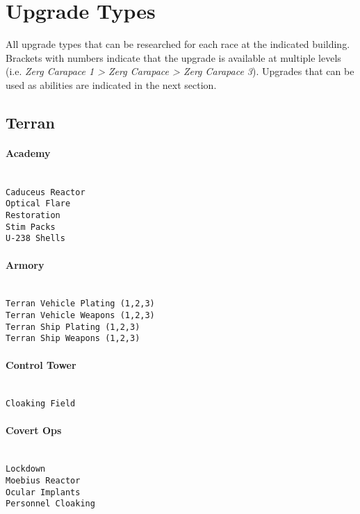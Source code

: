 \newpage
\section{Upgrade Types}
\label{upgradetype}
All upgrade types that can be researched for each race at the indicated building. Brackets with numbers indicate that the upgrade is available at multiple levels (i.e. \textit{Zerg Carapace 1 > Zerg Carapace > Zerg Carapace 3}). Upgrades that can be used as abilities are indicated in the next section.

\subsection{Terran}

\paragraph{Academy} \mbox{}\\
\verb|Caduceus Reactor|\\
\verb|Optical Flare|\\
\verb|Restoration|\\
\verb|Stim Packs|\\
\verb|U-238 Shells|

\paragraph{Armory} \mbox{}\\
\verb|Terran Vehicle Plating (1,2,3)|\\
\verb|Terran Vehicle Weapons (1,2,3)|\\
\verb|Terran Ship Plating (1,2,3)|\\
\verb|Terran Ship Weapons (1,2,3)|

\paragraph{Control Tower} \mbox{}\\
\verb|Cloaking Field|

\paragraph{Covert Ops} \mbox{}\\
\verb|Lockdown|\\
\verb|Moebius Reactor|\\
\verb|Ocular Implants|\\
\verb|Personnel Cloaking|

